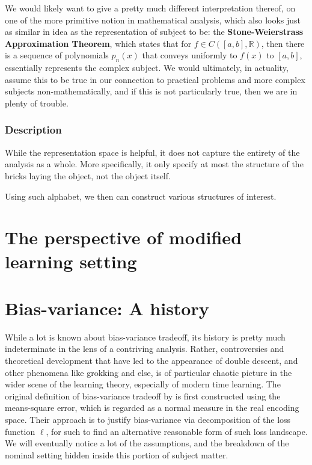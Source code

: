 We would likely want to give a pretty much different interpretation thereof, on one of the more primitive notion in mathematical analysis, which also looks just as similar in idea as the representation of subject to be: the \textbf{Stone-Weierstrass Approximation Theorem}, which states that for $f\in C([a,b],\mathbb{R})$, then there is a sequence of polynomials $p_{n}(x)$ that conveys uniformly to $f(x)$ to $[a,b]$, essentially represents the complex subject. We would ultimately, in actuality, assume this to be true in our connection to practical problems and more complex subjects non-mathematically, and if this is not particularly true, then we are in plenty of trouble. 

\subsubsection{Description}

While the representation space is helpful, it does not capture the entirety of the analysis as a whole. More specifically, it only specify at most the structure of the bricks laying the object, not the object itself. 

Using such alphabet, we then can construct various structures of interest. 

\section{The perspective of modified learning setting}



\clearpage

\section{Bias-variance: A history}
While a lot is known about bias-variance tradeoff, its history is pretty much indeterminate in the lens of a contriving analysis. Rather, controversies and theoretical development that have led to the appearance of double descent, and other phenomena like grokking and else, is of particular chaotic picture in the wider scene of the learning theory, especially of modern time learning. The original definition of bias-variance tradeoff by \cite{6797087} is first constructed using the means-square error, which is regarded as a normal measure in the real encoding space. Their approach is to justify bias-variance via decomposition of the loss function $\ell$, for such to find an alternative reasonable form of such loss landscape. We will eventually notice a lot of the assumptions, and the breakdown of the nominal setting hidden inside this portion of subject matter.

